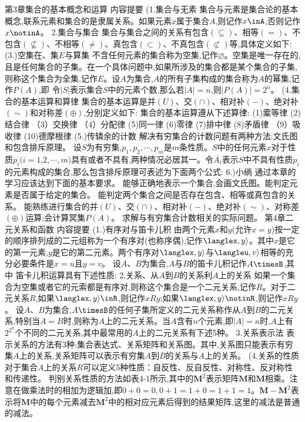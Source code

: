 {第3章集合的基本概念和运算}
{内容提要}
{(1.集合与无素}
集合与元素是集合论的基本概念,联系元素和集合的是隶属关系。如果元素$x$属于集合$A$,则记作$x\inA$,否则记作$x\notinA$。
{2.集合与集合}
集合与集合之间的关系有包含$(\subseteq)$、相等$(=)$、不包含$(\nsubseteq)$、不相等$(\neq)$、真包含$(\subset)$、不真包含$(\not\subset)$等,具体定义如下:
(3.)空集在、集$E$与算集
不含任何元素的集合称为空集,记作$\varnothing$。空集是唯一存在的,且是任何集合的子集。在一个具体问题中,如果所涉及的集合都是某个集合的子集,则称这个集合为全集,记作$E$。设$A$为集合,$A$的所有子集构成的集合称为$A$的幂集,记作$P(A)$,即
令$|S|$表示集合$S$中的元素个数,那么若$|A|=n$,则$|P(A)|=2^{n}$。
{(4.集合的基本运算和算律}
集合的基本运算是并$(U)$、交$(\cap)$、相对补$(-)$、绝对补$(\sim)$和对称差$(\oplus)$,分别定义如下:
集合的基本运算遵从下述算律:
(1)槖等律
(2)结合律
（3）交换律
（4）分配律
(5)同一律
(6)零律
(7)排中律
(8)矛盾律
（9）吸收律
(10)德摩根律
(5.)传辚余的计数
解决有穷集合的计数问题有两种方法:文氏图和包含排斥原理。
设$S$为有穷集,$p_{1},p_{2},\cdots,p_{m}$是$m$条性质。$S$中的任何元素$x$对于性质$p_{i}(i=1$,$2,\cdots,m)$具有或者不具有,两种情况必居其一。令$\overline{A_{i}}$表示$S$中不具有性质$p_{i}$的元素构成的集合,那么包含排斥原理可表述为下面两个公式:
6.)小绱
通过本章的学习应该达到下面的基本要求。
能够正确地表示一个集合,会画文氏图。能判定元素是否属于给定的集合。
能判定两个集合之间是否存在包含、相等或真包含的关系。
能熟练进行集合的并$(U)$、交$(\cap)$、相对补$(-)$、绝对补$(\sim)$、对称差$(\oplus)$运算;会计算冥集$P(A)$。
求解与有穷集合计数相关的实际问题。
{第4章二元关系和函数}
{内容提要}
{(1.)有序对与笛卡儿积}
由两个元素$x$和$y$(允许$x=y$)按一定的顺序排列成的二元组称为一个有序对(也称序偶),记作$\langlex,y\rangle$。其中$x$是它的第一元素,$y$是它的第二元素。两个有序对$\langlex,y\rangle$与$\langleu,v\rangle$相等的充分必要条件是$x=u$且$y=v$。
设$A、B$为集合,$A$与$B$的笛卡儿积记作$A\timesB$,其中
笛卡儿积运算具有下述性质:
{2.关系、从$A$到$B$的关系利$A$上的关系}
如果一个集合为空集或者它的元索都是有序对,则称这个集合是一个二元关系,记作$R$。对于二元关系$R$,如果$\langlex,y\rangle\inR$,则记作$xRy$;如果$\langlex,y\rangle\notinR$,则记作$xRy$。
设$A、B$为集合,$A\timesB$的任何子集所定义的二元关系称作从$A$到$B$的二元关系,特别当$A=B$时,则称为$A$上的二元关系。当$A$含有$n$个元素,即$|A|=n$时,$A$上有$2^{2^{n}}$个不同的二元关系,其中最常用的$A$上的二元关系有下述5种。
{3.关系表示法}
表示关系的方法有3种:集合表达式、关系矩阵和关系图。其中,关系图只能表示有穷集$A$上的关系,关系矩阵可以表示有穷集$A$到$B$的关系与$A$上的关系。
{(4.关系的性质}
对于集合$A$上的关系$R$可以定义5种性质：自反性、反自反性、对称性、反对称性和传递性。
判别关系性质的方法如表4-1所示,其中的$\boldsymbol{M}^{2}$表示矩阵$\boldsymbol{M}$和$\boldsymbol{M}$相乘。注意在做乘法时的相加为逻辑加,即$0+0=0,0+1=1+0=1+1=1。\boldsymbol{M}-\boldsymbol{M}^{2}$表示将$\boldsymbol{M}$中的每个元素减去$\boldsymbol{M}^{2}$中的相对应元素后得到的结果矩阵,这里的减法是普通的减法。
